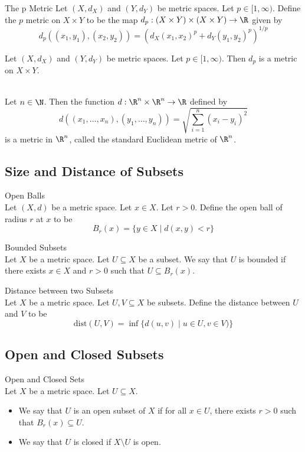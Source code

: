 \documentclass[a4paper]{article}
\begin{document}
\begin{defn}{The p Metric}{} Let $(X,d_X)$ and $(Y,d_Y)$ be metric spaces. Let $p\in[1,\infty)$. Define the $p$ metric on $X\times Y$ to be the map $d_p:(X\times Y)\times(X\times Y)\to\R$ given by $$d_p((x_1,y_1),(x_2,y_2))=\left(d_X(x_1,x_2)^p+d_Y(y_1,y_2)^p\right)^{1/p}$$
\end{defn}

\begin{prp}{}{} Let $(X,d_X)$ and $(Y,d_Y)$ be metric spaces. Let $p\in[1,\infty)$. Then $d_p$ is a metric on $X\times Y$. 
\end{prp}

\begin{eg}{}{}\\
Let $n\in\N$. Then the function $d:\R^n\times\R^n\to\R$ defined by $$d((x_1,\dots,x_n),(y_1,\dots,y_n))=\sqrt{\sum_{i=1}^n(x_i-y_i)^2}$$ is a metric in $\R^n$, called the standard Euclidean metric of $\R^n$. 
\end{eg}

\subsection{Size and Distance of Subsets}
\begin{defn}{Open Balls}{}\\
Let $(X,d)$ be a metric space. Let $x\in X$. Let $r>0$. Define the open ball of radius $r$ at $x$ to be $$B_r(x)=\{y\in X\;|\;d(x,y)<r\}$$
\end{defn}

\begin{defn}{Bounded Subsets}{}\\
Let $X$ be a metric space. Let $U\subseteq X$ be a subset. We say that $U$ is bounded if there exists $x\in X$ and $r>0$ such that $U\subseteq B_r(x)$. 
\end{defn}

\begin{defn}{Distance between two Subsets}{}\\
Let $X$ be a metric space. Let $U,V\subseteq X$ be subsets. Define the distance between $U$ and $V$ to be $$\text{dist}(U,V)=\inf\{d(u,v)\;|\;u\in U,v\in V)\}$$
\end{defn}

\subsection{Open and Closed Subsets}
\begin{defn}{Open and Closed Sets}{}\\
Let $X$ be a metric space. Let $U\subseteq X$. 
\begin{itemize}
\item We say that $U$ is an open subset of $X$ if for all $x\in U$, there exists $r>0$ such that $B_r(x)\subseteq U$. 
\item We say that $U$ is closed if $X\setminus U$ is open. 
\end{itemize}
\end{defn}
\end{document}
